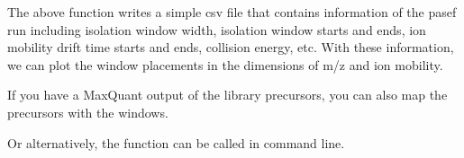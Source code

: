 \documentclass[letterpaper,10pt,english]{sphinxmanual}
\begin{document}
The above function writes a simple csv file that contains information of the pasef run
including isolation window width, isolation window starts and ends, ion mobility drift
time starts and ends, collision energy, etc. With these information, we can plot the
window placements in the dimensions of m/z and ion mobility.

\begin{sphinxVerbatim}[commandchars=\\\{\}]
   
   

  
  
  
\end{sphinxVerbatim}

If you have a MaxQuant output of the library precursors, you can also map the precursors
with the windows.

\begin{sphinxVerbatim}[commandchars=\\\{\}]
   
   

  
  
  
     
\end{sphinxVerbatim}

Or alternatively, the function can be called in command line.

\begin{sphinxVerbatim}[commandchars=\\\{\}]
  
\end{sphinxVerbatim}
\end{document}
